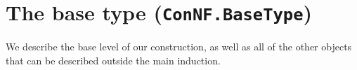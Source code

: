 \chapter{The base type (\texttt{ConNF.BaseType})}

We describe the base level of our construction, as well as all of the other objects that can be described outside the main induction.







